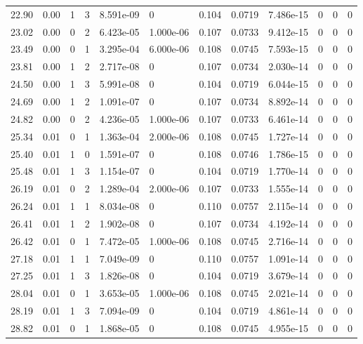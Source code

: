 \documentclass[preview]{standalone}
\begin{document}
{{{\begin{tabular}{L{1.2cm}C{1.2cm} C{0.3cm}C{0.5cm} C{1.4cm}C{1.4cm} C{1.4cm}C{1.4cm} C{1.6cm}C{1.6cm} C{1.6cm}C{1.6cm}}
  22.90  &  0.00  & 1     &  3 &  8.591e-09  & 0  &  0.104&   0.0719& 7.486e-15 & 0   &  0 & 0  \\ 
  23.02  &  0.00  & 0     &  2 &  6.423e-05  & 1.000e-06  &  0.107&   0.0733& 9.412e-15 & 0   &  0 & 0  \\ 
  23.49  &  0.00  & 0     &  1 &  3.295e-04  & 6.000e-06  &  0.108&   0.0745& 7.593e-15 & 0   &  0 & 0  \\ 
  23.81  &  0.00  & 1     &  2 &  2.717e-08  & 0  &  0.107&   0.0734& 2.030e-14 & 0   &  0 & 0  \\ 
  24.50  &  0.00  & 1     &  3 &  5.991e-08  & 0  &  0.104&   0.0719& 6.044e-15 & 0   &  0 & 0  \\ 
  24.69  &  0.00  & 1     &  2 &  1.091e-07  & 0  &  0.107&   0.0734& 8.892e-14 & 0   &  0 & 0  \\ 
  24.82  &  0.00  & 0     &  2 &  4.236e-05  & 1.000e-06  &  0.107&   0.0733& 6.461e-14 & 0   &  0 & 0  \\ 
  25.34  &  0.01  & 0     &  1 &  1.363e-04  & 2.000e-06  &  0.108&   0.0745& 1.727e-14 & 0   &  0 & 0  \\ 
  25.40  &  0.01  & 1     &  0 &  1.591e-07  & 0  &  0.108&   0.0746& 1.786e-15 & 0   &  0 & 0  \\ 
  25.48  &  0.01  & 1     &  3 &  1.154e-07  & 0  &  0.104&   0.0719& 1.770e-14 & 0   &  0 & 0  \\ 
  26.19  &  0.01  & 0     &  2 &  1.289e-04  & 2.000e-06  &  0.107&   0.0733& 1.555e-14 & 0   &  0 & 0  \\ 
  26.24  &  0.01  & 1     &  1 &  8.034e-08  & 0  &  0.110&   0.0757& 2.115e-14 & 0   &  0 & 0  \\ 
  26.41  &  0.01  & 1     &  2 &  1.902e-08  & 0  &  0.107&   0.0734& 4.192e-14 & 0   &  0 & 0  \\ 
  26.42  &  0.01  & 0     &  1 &  7.472e-05  & 1.000e-06  &  0.108&   0.0745& 2.716e-14 & 0   &  0 & 0  \\ 
  27.18  &  0.01  & 1     &  1 &  7.049e-09  & 0  &  0.110&   0.0757& 1.091e-14 & 0   &  0 & 0  \\ 
  27.25  &  0.01  & 1     &  3 &  1.826e-08  & 0  &  0.104&   0.0719& 3.679e-14 & 0   &  0 & 0  \\ 
  28.04  &  0.01  & 0     &  1 &  3.653e-05  & 1.000e-06  &  0.108&   0.0745& 2.021e-14 & 0   &  0 & 0  \\ 
  28.19  &  0.01  & 1     &  3 &  7.094e-09  & 0  &  0.104&   0.0719& 4.861e-14 & 0   &  0 & 0  \\ 
  28.82  &  0.01  & 0     &  1 &  1.868e-05  & 0  &  0.108&   0.0745& 4.955e-15 & 0   &  0 & 0  \\ 

\end{tabular}}}}
\end{document}
